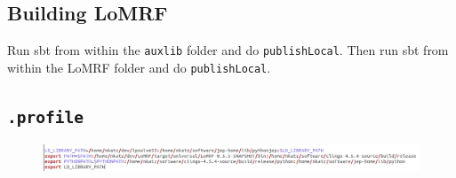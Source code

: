 \documentclass[12pt]{article}
\begin{document}
\subsection*{Building LoMRF}
Run sbt from within the \texttt{auxlib} folder and do \texttt{publishLocal}. Then run sbt from within the LoMRF folder and do \texttt{publishLocal}.

\subsection*{\texttt{.profile}}
\begin{figure}[h]
\centering
\includegraphics[width=\textwidth]{./figures/profile-example.png}
\end{figure} 
\end{document}
